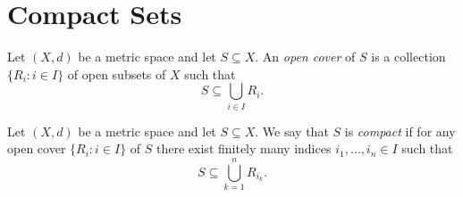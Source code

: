 \section{Compact Sets}
\begin{definition}
  Let $(X, d)$ be a metric space and let $S \subseteq X$.
  An \emph{open cover} of $S$ is a collection $\{R_i: i \in I\}$ of open
  subsets of $X$ such that
  \begin{equation*}
    S \subseteq \bigcup_{i \in I} R_i.
  \end{equation*}
\end{definition}

\begin{definition}
  Let $(X, d)$ be a metric space and let $S \subseteq X$.
  We say that $S$ is \emph{compact} if for any open cover $\{R_i: i \in I\}$
  of $S$ there exist finitely many indices $i_1, \dots, i_n \in I$
  such that
  \begin{equation*}
    S \subseteq \bigcup_{k=1}^n R_{i_k}.
  \end{equation*}
\end{definition}
